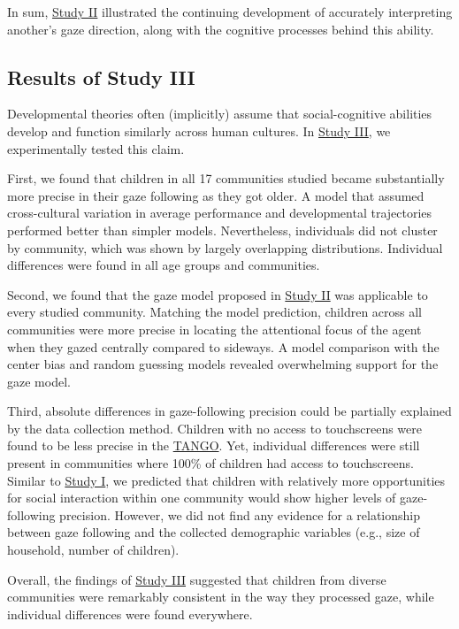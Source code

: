 \documentclass[
]{scrbook}
\begin{document}
In sum, \hyperref[studyII]{Study II} illustrated the continuing development of accurately interpreting another's gaze direction, along with the cognitive processes behind this ability.

\subsection{Results of Study III}\label{results-studyIII}

Developmental theories often (implicitly) assume that social-cognitive abilities develop and function similarly across human cultures. In \hyperref[studyIII]{Study III}, we experimentally tested this claim.

First, we found that children in all 17 communities studied became substantially more precise in their gaze following as they got older. A model that assumed cross-cultural variation in average performance and developmental trajectories performed better than simpler models. Nevertheless, individuals did not cluster by community, which was shown by largely overlapping distributions. Individual differences were found in all age groups and communities.

Second, we found that the gaze model proposed in \hyperref[studyII]{Study II} was applicable to every studied community. Matching the model prediction, children across all communities were more precise in locating the attentional focus of the agent when they gazed centrally compared to sideways. A model comparison with the center bias and random guessing models revealed overwhelming support for the gaze model.

Third, absolute differences in gaze-following precision could be partially explained by the data collection method. Children with no access to touchscreens were found to be less precise in the \hyperref[acronyms_TANGO]{TANGO}. Yet, individual differences were still present in communities where 100\% of children had access to touchscreens. Similar to \hyperref[studyI]{Study I}, we predicted that children with relatively more opportunities for social interaction within one community would show higher levels of gaze-following precision. However, we did not find any evidence for a relationship between gaze following and the collected demographic variables (e.g., size of household, number of children).

Overall, the findings of \hyperref[studyIII]{Study III} suggested that children from diverse communities were remarkably consistent in the way they processed gaze, while individual differences were found everywhere.
\end{document}
